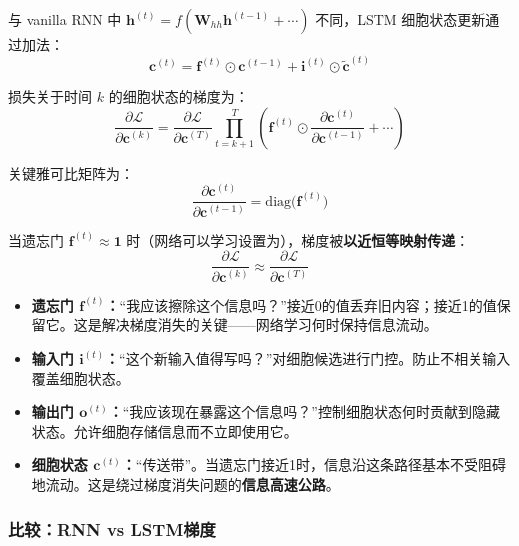 与 vanilla RNN 中 $\mathbf{h}^{(t)} = f(\mathbf{W}_{hh}\mathbf{h}^{(t-1)} + \cdots)$ 不同，LSTM 细胞状态更新通过加法：
\begin{equation}
\mathbf{c}^{(t)} = \mathbf{f}^{(t)} \odot \mathbf{c}^{(t-1)} + \mathbf{i}^{(t)} \odot \tilde{\mathbf{c}}^{(t)}
\end{equation}

损失关于时间 $k$ 的细胞状态的梯度为：
\begin{equation}
\frac{\partial \mathcal{L}}{\partial \mathbf{c}^{(k)}} = \frac{\partial \mathcal{L}}{\partial \mathbf{c}^{(T)}} \prod_{t=k+1}^{T} \left( \mathbf{f}^{(t)} \odot \frac{\partial \mathbf{c}^{(t)}}{\partial \mathbf{c}^{(t-1)}} + \cdots \right)
\end{equation}

关键雅可比矩阵为：
\begin{equation}
\frac{\partial \mathbf{c}^{(t)}}{\partial \mathbf{c}^{(t-1)}} = \text{diag}\bigl(\mathbf{f}^{(t)}\bigr)
\end{equation}

当遗忘门 $\mathbf{f}^{(t)} \approx \mathbf{1}$ 时（网络可以学习设置为），梯度被\textbf{以近恒等映射传递}：
\begin{equation}
\frac{\partial \mathcal{L}}{\partial \mathbf{c}^{(k)}} \approx \frac{\partial \mathcal{L}}{\partial \mathbf{c}^{(T)}}
\end{equation}

\begin{properties}[直觉：每个门做什么]
\begin{itemize}
    \item \textbf{遗忘门 $\mathbf{f}^{(t)}$：}“我应该擦除这个信息吗？”接近0的值丢弃旧内容；接近1的值保留它。这是解决梯度消失的关键——网络学习何时保持信息流动。
    \item \textbf{输入门 $\mathbf{i}^{(t)}$：}“这个新输入值得写吗？”对细胞候选进行门控。防止不相关输入覆盖细胞状态。
    \item \textbf{输出门 $\mathbf{o}^{(t)}$：}“我应该现在暴露这个信息吗？”控制细胞状态何时贡献到隐藏状态。允许细胞存储信息而不立即使用它。
    \item \textbf{细胞状态 $\mathbf{c}^{(t)}$：}“传送带”。当遗忘门接近1时，信息沿这条路径基本不受阻碍地流动。这是绕过梯度消失问题的\textbf{信息高速公路}。
\end{itemize}
\end{properties}

\subsubsection{比较：RNN vs LSTM梯度}

